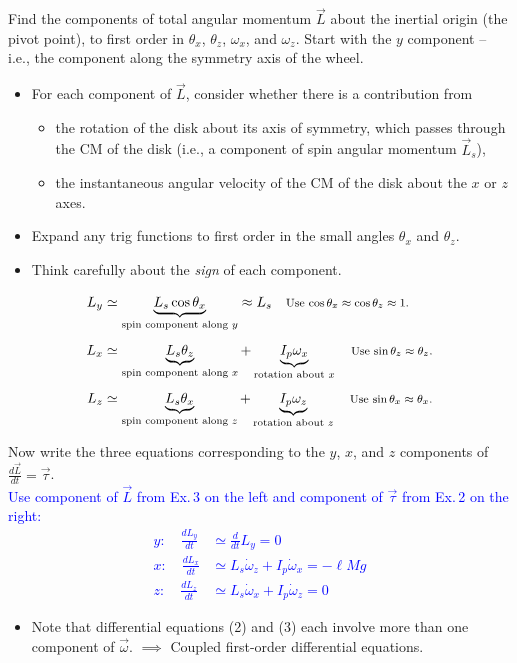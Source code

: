 \documentclass[11pt, letterpaper, openany]{book}
\newenvironment{exercise}[1][Exercise]{%
  \tcolorbox[blanker, breakable, left=1em,
    before skip=1em, after skip=1em,
    borderline west={3pt}{0pt}{PhysNavy},
    colback=PhysCream,
    before upper={\textcolor{PhysNavy}{\sffamily\bfseries #1:}\space}
  ]%
}{%
  \endtcolorbox%
}
\begin{document}
\begin{exercise}[Exercise 3]
Find the components of total angular momentum $\vec{L}$ about the inertial origin (the pivot point), to first order in $\theta_x$, $\theta_z$, $\omega_x$, and $\omega_z$. Start with the $y$ component -- i.e., the component along the symmetry axis of the wheel.
\begin{itemize}
    \item For each component of $\vec{L}$, consider whether there is a contribution from
    \begin{itemize}
        \item the rotation of the disk about its axis of symmetry, which passes through the CM of the disk (i.e., a component of spin angular momentum $\vec{L}_s$),
        \item the instantaneous angular velocity of the CM of the disk about the $x$ or $z$ axes.
    \end{itemize}
    \item Expand any trig functions to first order in the small angles $\theta_x$ and $\theta_z$.
    \item Think carefully about the \textit{sign} of each component.
\end{itemize}
\textcolor{blue}{
\begin{align*}
    L_y &\simeq \underbrace{L_s \cos\theta_x}_{\text{spin component along $y$}} \approx L_s \quad \text{\footnotesize{Use $\cos\theta_x \approx \cos\theta_z \approx 1$.}} \\[6pt]
    L_x &\simeq \underbrace{L_s \theta_z}_{\text{spin component along $x$}} + \underbrace{I_p \omega_x}_{\text{rotation about $x$}} \quad \text{\footnotesize{Use $\sin\theta_z \approx \theta_z$.}} \\[6pt]
    L_z &\simeq \underbrace{L_s \theta_x}_{\text{spin component along $z$}} + \underbrace{I_p \omega_z}_{\text{rotation about $z$}} \quad \text{\footnotesize{Use $\sin\theta_x \approx \theta_x$.}}
\end{align*}
}
\end{exercise}

\begin{exercise}[Exercise 4]
Now write the three equations corresponding to the $y$, $x$, and $z$ components of $\frac{d\vec{L}}{dt} = \vec{\tau}$. \\
\textcolor{blue}{
Use component of $\vec{L}$ from Ex.\,3 on the left and component of $\vec{\tau}$ from Ex.\,2 on the right:
\begin{align}
    y: \quad \frac{dL_y}{dt} &\simeq \frac{d}{dt}L_y = 0 \tag{1} \\
    x: \quad \frac{dL_x}{dt} &\simeq L_s\dot{\omega}_z + I_p\dot{\omega}_x = -\ell Mg \tag{2} \\
    z: \quad \frac{dL_z}{dt} &\simeq L_s\dot{\omega}_x + I_p\dot{\omega}_z = 0 \tag{3}
\end{align}
}
\begin{itemize}
    \item Note that differential equations (2) and (3) each involve more than one component of $\vec{\omega}$.
    $\implies$ Coupled first-order differential equations.
\end{itemize}
\end{exercise}
\end{document}
